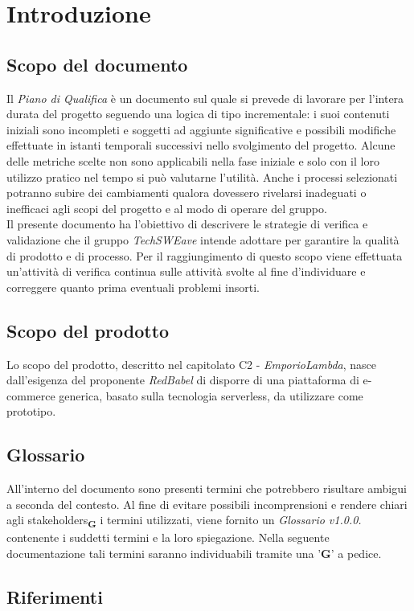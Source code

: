 \section{Introduzione}
\subsection{Scopo del documento}
Il \textit{Piano di Qualifica} è un documento sul quale si prevede di lavorare per l'intera durata del progetto seguendo una
logica di tipo incrementale: i suoi contenuti iniziali sono incompleti e soggetti ad aggiunte significative e possibili modifiche 
effettuate in istanti temporali successivi nello svolgimento del progetto.
Alcune delle metriche scelte non sono applicabili nella fase iniziale e solo con il loro utilizzo pratico nel tempo
si può valutarne l'utilità. Anche i processi selezionati potranno subire dei cambiamenti qualora dovessero rivelarsi
inadeguati o inefficaci agli scopi del progetto e al modo di operare del gruppo.\\
Il presente documento ha l'obiettivo di descrivere le strategie di verifica e validazione che il gruppo \textit{TechSWEave} intende
adottare per garantire la qualità di prodotto e di processo. Per il raggiungimento di questo scopo viene effettuata
un'attività di verifica continua sulle attività svolte al fine d'individuare e correggere quanto prima 
eventuali problemi insorti.
\subsection{Scopo del prodotto}
Lo scopo del prodotto, descritto nel capitolato C2 - \textit{EmporioLambda}, nasce dall'esigenza del proponente \textit{RedBabel}
di disporre di una piattaforma di e-commerce generica, basato sulla tecnologia serverless, da utilizzare come prototipo.
\subsection{Glossario}
All'interno del documento sono presenti termini che potrebbero risultare ambigui a seconda del contesto. Al fine di evitare possibili incomprensioni 
e rendere chiari agli stakeholders\textsubscript{\textbf{G}} i termini utilizzati, viene fornito un \textit{Glossario v1.0.0.} contenente i suddetti termini 
e la loro spiegazione. Nella seguente documentazione tali termini saranno individuabili tramite una '\textbf{G}' a pedice.
\subsection{Riferimenti}
